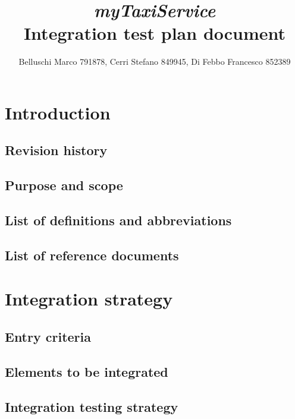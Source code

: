 \documentclass[]{report}
\title{{\Huge\textit{myTaxiService}}\\{\Large Integration test plan document}}
\author{Belluschi Marco 791878, Cerri Stefano 849945, Di Febbo Francesco 852389}
\begin{document}
\maketitle

\tableofcontents

\chapter{Introduction}

	\section{Revision history}
	

	\section{Purpose and scope}
	

	\section{List of definitions and abbreviations}
	

	\section{List of reference documents}
	

\chapter{Integration strategy}

	\section{Entry criteria}
	

	\section{Elements to be integrated}
	

	\section{Integration testing strategy}
	
\end{document}
